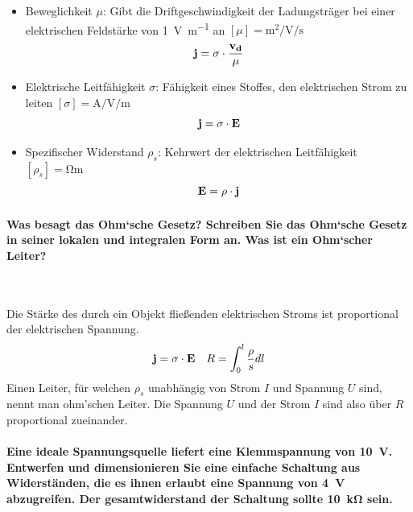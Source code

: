 \documentclass[a4paper, 11pt, parskip=half]{scrartcl}
\begin{document}
\begin{itemize}
    \item Beweglichkeit $\mu$: Gibt die Driftgeschwindigkeit der Ladungsträger bei einer
        elektrischen Feldstärke von \SI{1}{\V\per\m} an $[\mu] = \si{\m\squared\per\V\per\s}$
        \begin{equation}
            \bold{j} = \sigma \cdot \frac{\bold{v_d}}{\mu}
        \end{equation}
    
    \item Elektrische Leitfähigkeit $\sigma$: Fähigkeit eines Stoffes, den elektrischen Strom zu
        leiten $[\sigma] = \si{\A\per\V\per\m}$
        \begin{equation}
            \bold{j} = \sigma \cdot \bold{E}
        \end{equation}
    
    \item Spezifischer Widerstand $\rho_s$: Kehrwert der elektrischen Leitfähigkeit
        $[\rho_s] = \si{\ohm\m}$
        \begin{equation}
            \bold{E} = \rho \cdot \bold{j}
        \end{equation}
\end{itemize}

\paragraph{Was besagt das Ohm‘sche Gesetz? Schreiben Sie das Ohm‘sche Gesetz in seiner lokalen und
integralen Form an. Was ist ein Ohm‘scher Leiter?} ~

Die Stärke des durch ein Objekt fließenden elektrischen Stroms ist proportional der elektrischen
Spannung.
\begin{equation}
    \bold{j} = \sigma \cdot \bold{E} ~~~ R = \int_0^l \frac{\rho}{s} dl
\end{equation}
Einen Leiter, für welchen $\rho_s$ unabhängig von Strom $I$ und Spannung $U$ sind, nennt man
ohm'schen Leiter. Die Spannung $U$ und der Strom $I$ sind also über $R$ proportional zueinander.

\paragraph{Eine ideale Spannungsquelle liefert eine Klemmspannung von \SI{10}{\V}. Entwerfen und
dimensionieren Sie eine einfache Schaltung aus Widerständen, die es ihnen erlaubt eine Spannung von
\SI{4}{\V} abzugreifen. Der gesamtwiderstand der Schaltung sollte \SI{10}{\kilo\ohm} sein.}
\end{document}
